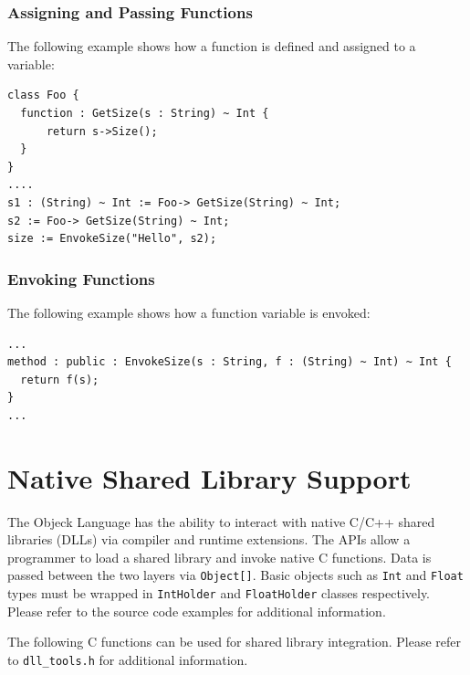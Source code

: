 \documentclass[12pt]{article}
\begin{document}
\subsubsection{Assigning and Passing Functions}
The following example shows how a function is defined and assigned to
a variable:
\begin{verbatim}
class Foo {
  function : GetSize(s : String) ~ Int {
      return s->Size();
  }
}
....
s1 : (String) ~ Int := Foo-> GetSize(String) ~ Int;
s2 := Foo-> GetSize(String) ~ Int;
size := EnvokeSize("Hello", s2);
\end{verbatim}

\subsubsection{Envoking Functions}
The following example shows how a function variable is envoked:
\begin{verbatim}
...
method : public : EnvokeSize(s : String, f : (String) ~ Int) ~ Int {
  return f(s);
}
...
\end{verbatim}

\section{Native Shared Library Support}
The Objeck Language has the ability to interact with native C/C++
shared libraries (DLLs) via compiler and runtime extensions.  The APIs
allow a programmer to load a shared library and invoke native C
functions.  Data is passed between the two layers via
\texttt{Object[]}.  Basic objects such as \texttt{Int} and
\texttt{Float} types must be wrapped in \texttt{IntHolder} and
\texttt{FloatHolder} classes respectively.  Please refer to the source
code examples for additional information.

The following C functions can be used for shared library integration.
Please refer to \texttt{dll\_tools.h} for additional information.
\end{document}
